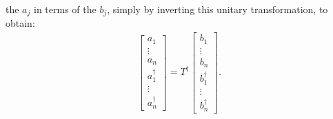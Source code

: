\documentclass[12pt]{article}
\begin{document}
{the $a_j$ in terms of the $b_j$, simply by inverting this unitary
transformation, to obtain:
\begin{eqnarray}
  \left[ \begin{array}{c} a_1 \\ \vdots \\ a_n \\
    a_1^\dagger \\ \vdots \\ a_n^\dagger \end{array} \right]
  = T^\dagger
  \left[ \begin{array}{c} b_1 \\ \vdots \\ b_n \\
    b_1^\dagger \\ \vdots \\ b_n^\dagger \end{array} \right].
\end{eqnarray}

}
\end{document}
